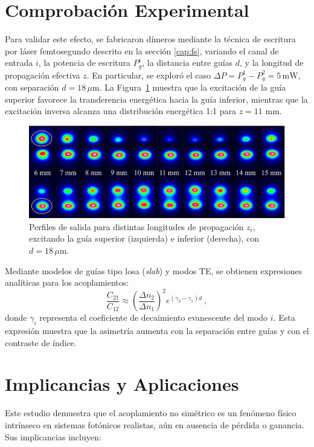 \section{Comprobación Experimental}
Para validar este efecto, se fabricaron dímeros mediante la técnica de escritura por láser femtosegundo descrito en la sección \ref{cap:fs}, variando el canal de entrada \( i \), la potencia de escritura \( P_{g}^i \), la distancia entre guías \( d \), y la longitud de propagación efectiva \( z \). En particular, se exploró el caso \( \Delta P = P_g^1 - P_g^2 = 5\,\mathrm{mW} \), con separación \( d = 18\,\mu\mathrm{m} \). La Figura~\ref{fig:nosymexp} muestra que la excitación de la guía superior favorece la transferencia energética hacia la guía inferior, mientras que la excitación inversa alcanza una distribución energética 1:1 para $z=11$ mm.
\begin{figure}[H]
	\centering
	\includegraphics[width=\linewidth]{media/nonsymm-exp.png}
	\caption{Perfiles de salida para distintas longitudes de propagación \( z_i \), excitando la guía superior (izquierda) e inferior (derecha), con \( d = 18\,\mu\mathrm{m} \). \label{fig:nosymexp}}
\end{figure}
Mediante modelos de guías tipo losa (\textit{slab}) y modos TE, se obtienen expresiones analíticas para los acoplamientos:
\begin{equation}
	\frac{C_{21}}{C_{12}} \approx \left( \frac{\Delta n_2}{\Delta n_1} \right)^2 e^{(\gamma_2 - \gamma_1) d} \ ,
\end{equation}
donde \( \gamma_i \) representa el coeficiente de decaimiento evanescente del modo \( i \). Esta expresión muestra que la asimetría aumenta con la separación entre guías y con el contraste de índice. 

\section{Implicancias y Aplicaciones}

Este estudio demuestra que el acoplamiento no simétrico es un fenómeno físico intrínseco en sistemas fotónicos realistas, aún en ausencia de pérdida o ganancia. Sus implicancias incluyen:

